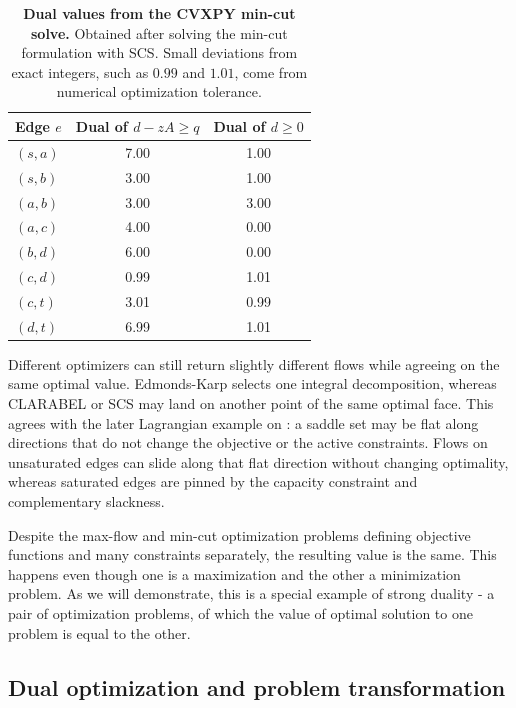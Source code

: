 \documentclass[12pt, openany]{article}
\begin{document}
\begin{table}[H]
    \centering
    \small
    \begin{tabular}{lcc}
        \hline
        Edge \(e\) & Dual of \(d - zA \ge q\) & Dual of \(d \ge 0\) \\
        \hline
        \((s,a)\) & 7.00 & 1.00 \\
        \((s,b)\) & 3.00 & 1.00 \\
        \((a,b)\) & 3.00 & 3.00 \\
        \((a,c)\) & 4.00 & 0.00 \\
        \((b,d)\) & 6.00 & 0.00 \\
        \((c,d)\) & 0.99 & 1.01 \\
        \((c,t)\) & 3.01 & 0.99 \\
        \((d,t)\) & 6.99 & 1.01 \\
        \hline
    \end{tabular}
    \caption{\textbf{Dual values from the CVXPY min-cut solve.} Obtained after solving the min-cut formulation with SCS. Small deviations from exact integers, such as \(0.99\) and \(1.01\), come from numerical optimization tolerance.}
    \label{tab:mincut_duals}
\end{table}

Different optimizers can still return slightly different flows while agreeing on the same optimal value. Edmonds-Karp selects one integral decomposition, whereas CLARABEL or SCS may land on another point of the same optimal face. This agrees with the later Lagrangian example on : a saddle set may be flat along directions that do not change the objective or the active constraints. Flows on unsaturated edges can slide along that flat direction without changing optimality, whereas saturated edges are pinned by the capacity constraint and complementary slackness.

Despite the max-flow and min-cut optimization problems defining objective functions and many constraints separately, the resulting value is the same. This happens even though one is a maximization and the other a minimization problem. As we will demonstrate, this is a special example of strong duality - a pair of optimization problems, of which the value of optimal solution to one problem is equal to the other.


\subsection{Dual optimization and problem transformation}
\end{document}
